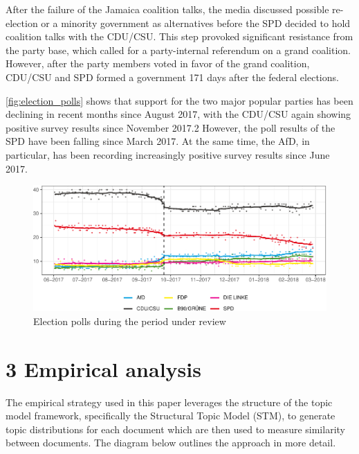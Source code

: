 \documentclass[
  12pt,
]{article}
\begin{document}
After the failure of the Jamaica coalition talks, the media discussed
possible re-election or a minority government as alternatives before the
SPD decided to hold coalition talks with the CDU/CSU. This step provoked
significant resistance from the party base, which called for a
party-internal referendum on a grand coalition. However, after the party
members voted in favor of the grand coalition, CDU/CSU and SPD formed a
government 171 days after the federal elections.

\autoref{fig:election_polls} shows that support for the two major
popular parties has been declining in recent months since August 2017,
with the CDU/CSU again showing positive survey results since November
2017.2 However, the poll results of the SPD have been falling since
March 2017. At the same time, the AfD, in particular, has been recording
increasingly positive survey results since June 2017.

\begin{figure}

{\centering \includegraphics[width=0.8\linewidth]{main_text_files/figure-latex/election polls-1} 

}

\caption{Election polls during the period under review \label{fig:election_polls}}\label{fig:election polls}
\end{figure}

\pagebreak

\hypertarget{empirical-analysis}{%
\section{3 Empirical analysis}\label{empirical-analysis}}

The empirical strategy used in this paper leverages the structure of the
topic model framework, specifically the Structural Topic Model (STM), to
generate topic distributions for each document which are then used to
measure similarity between documents. The diagram below outlines the
approach in more detail.
\end{document}

